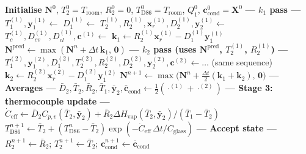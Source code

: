 \documentclass[11pt,letterpaper]{article}
\newcommand{\dt}{\Delta t}
\begin{document}
\begin{algorithm}[H]
\caption{D86 simulation — \texttt{run\_d86\_simulation\_rk2\_condenser\_optE\_v2}}
\begin{algorithmic}[1]
\State \textbf{Initialise} $\mathbf{N}^0$, $T_2^0 = T_{\mathrm{room}}$, $R_2^0 = 0$,
       $T_{\mathrm{D86}}^0 = T_{\mathrm{room}}$, $Q_1^0$, $\mathbf{c}_{\mathrm{cond}}^0 = \mathbf{X}^0$
  \State \textbf{--- $k_1$ pass ---}
  \State $T_1^{(1)}, \mathbf{y}_1^{(1)} \leftarrow$  \hfill{}
  \State $D_1^{(1)} \leftarrow$  \hfill{}
  \State $T_2^{(1)}, R_2^{(1)}, \mathbf{x}_r^{(1)}, D_2^{(1)}, \mathbf{y}_2^{(1)} \leftarrow$  \hfill{}
  \State $T_c^{(1)}, D_{cv}^{(1)}, D_{cl}^{(1)}, \mathbf{c}^{(1)} \leftarrow$  \hfill{}
  \State $\mathbf{k}_1 \leftarrow R_2^{(1)}\mathbf{x}_r^{(1)} - D_1^{(1)}\mathbf{y}_1^{(1)}$ \hfill{}
  \State $\mathbf{N}^{\mathrm{pred}} \leftarrow \max(\mathbf{N}^n + \dt\,\mathbf{k}_1,\, \mathbf{0})$ \hfill{}
  \State \textbf{--- $k_2$ pass (uses $\mathbf{N}^{\mathrm{pred}}$, $T_2^{(1)}$, $R_2^{(1)}$) ---}
  \State $T_1^{(2)}, \mathbf{y}_1^{(2)}, D_1^{(2)}, T_2^{(2)}, R_2^{(2)}, D_2^{(2)}, \mathbf{y}_2^{(2)}, \mathbf{c}^{(2)} \leftarrow \ldots$ (same sequence)
  \State $\mathbf{k}_2 \leftarrow R_2^{(2)}\mathbf{x}_r^{(2)} - D_1^{(2)}\mathbf{y}_1^{(2)}$
  \State $\mathbf{N}^{n+1} \leftarrow \max\!\bigl(\mathbf{N}^n + \tfrac{\dt}{2}(\mathbf{k}_1+\mathbf{k}_2),\, \mathbf{0}\bigr)$ \hfill{}
  \State \textbf{--- Averages ---}
  \State $\bar{D}_2, \bar{T}_2, \bar{R}_2, \bar{T}_1, \bar{\mathbf{y}}_2, \bar{\mathbf{c}}_{\mathrm{cond}} \leftarrow \tfrac{1}{2}(\cdot^{(1)} + \cdot^{(2)})$
  \State \textbf{--- Stage 3: thermocouple update ---}
  \State $\dot{C}_{\mathrm{eff}} \leftarrow \bar{D}_2 C_{p,v}(\bar{T}_2, \bar{\mathbf{y}}_2) + \bar{R}_2 \Delta H_{\mathrm{vap}}(\bar{T}_2, \bar{\mathbf{y}}_2)/(\bar{T}_1 - \bar{T}_2)$ \hfill{}
  \State $T_{\mathrm{D86}}^{n+1} \leftarrow \bar{T}_2 + (T_{\mathrm{D86}}^n - \bar{T}_2)\exp(-\dot{C}_{\mathrm{eff}}\,\dt / C_{\mathrm{glass}})$ \hfill{}
  \State \textbf{--- Accept state ---}
  \State $R_2^{n+1} \leftarrow \bar{R}_2$; \quad $T_2^{n+1} \leftarrow \bar{T}_2$; \quad $\mathbf{c}_{\mathrm{cond}}^{n+1} \leftarrow \bar{\mathbf{c}}_{\mathrm{cond}}$

\end{algorithmic}
\end{algorithm}
\end{document}
